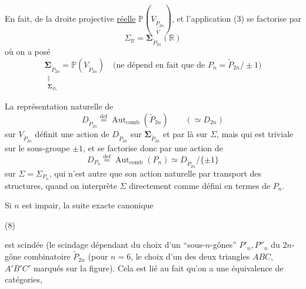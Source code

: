  En fait,   de la droite projective \uline{réelle} $\mathbb P(\underset{V}{\underline{V_{\widetilde P_{2n}}}})$, et l'application (3) se factorise par 
\[
\tag{4}\Sigma_{\mathbb R}=\boldsymbol\Sigma_{\widetilde P_{2n}}(\mathbb R)
\]
où on a posé
\[
\tag{5}
\underset{\substack{\Vert\\\boldsymbol\Sigma_{P_n}}}{\boldsymbol\Sigma_{\widetilde P_{2n}}}
=\mathbb P(V_{\widetilde P_{2n}})
\quad\text{(ne dépend en fait que de }P_n=\widetilde P_{2n}/\pm1\text{)}
\]

La représentation naturelle de 
\[
\tag{6}D_{\widetilde P_{2n}}\overset{\mathrm{def}}=\operatorname{Aut}_{\mathrm{comb}}(\widetilde P_{2n})
\qquad(\simeq D_{2n})
\]
sur $V_{\widetilde P_{2n}}$ définit une action de $D_{\widetilde P_{2n}}$ sur $\boldsymbol\Sigma_{\widetilde P_{2n}}$ et par là sur $\Sigma$, mais qui est triviale sur le sous-groupe $\pm1$, et se factorise donc par une action de
\[
\tag{7}D_{P_n}\overset{\mathrm{def}}=\operatorname{Aut}_{\mathrm{comb}}(P_n)
\simeq D_{\widetilde P_{2n}}/\{\pm1\}
\]
sur $\Sigma=\Sigma_{P_n}$, qui n'est autre que son action naturelle par transport des structures, quand on interprète $\Sigma$ directement comme défini en termes de $P_n$.

 Si $n$ est impair, la suite exacte canonique

(8)

est scindée  (le  scindage dépendant du choix d'un  ``sous-$n$-gônes'' $P'_n,P''_n$ du $2n$-gône combinatoire $\widetilde P_{2n}$ (pour $n=6$, le choix d'un des deux triangles $ABC$, $A'B'C'$ marqués sur la figure). Cela est lié au fait qu'on a une équivalence de catégories, 


